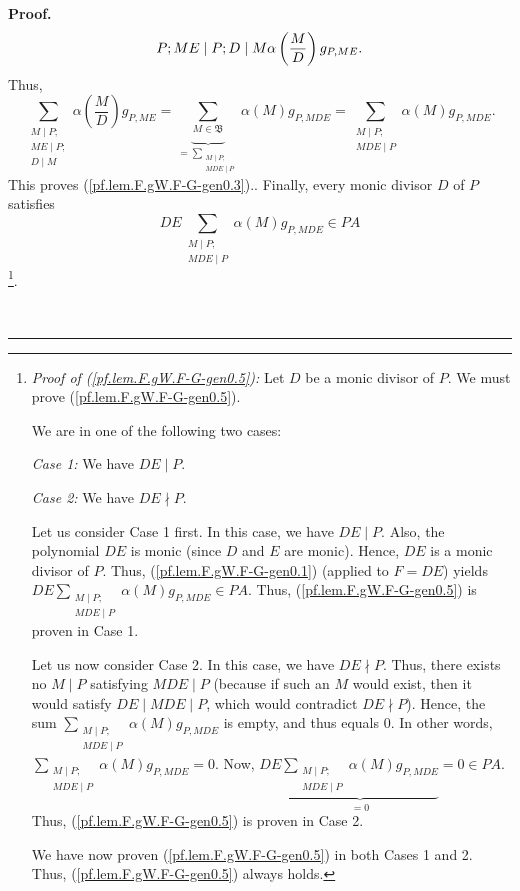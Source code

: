 \documentclass[numbers=enddot,12pt,final,onecolumn,notitlepage]{scrartcl}%
\theoremstyle{definition}
\newenvironment{proof}[1][Proof]{\noindent\textbf{#1.} }{\ \rule{0.5em}{0.5em}}
\let\sumnonlimits\sum
\renewcommand{\sum}{\sumnonlimits\limits}
\begin{document}
\begin{proof}
{\[{{P;\\ME\mid P;\\D\mid M}}\alpha\left(  \dfrac{M}{D}\right)  g_{P,ME}.
\]
Thus,%
\[
\sum_{\substack{M\mid P;\\ME\mid P;\\D\mid M}}\alpha\left(  \dfrac{M}%
{D}\right)  g_{P,ME}=\underbrace{\sum_{M\in\mathfrak{B}}}_{=\sum
_{\substack{M\mid P;\\MDE\mid P}}}\alpha\left(  M\right)  g_{P,MDE}%
=\sum_{\substack{M\mid P;\\MDE\mid P}}\alpha\left(  M\right)  g_{P,MDE}.
\]
This proves (\ref{pf.lem.F.gW.F-G-gen0.3}).}. Finally, every monic divisor $D$
of $P$ satisfies
\begin{equation}
DE\sum_{\substack{M\mid P;\\MDE\mid P}}\alpha\left(  M\right)  g_{P,MDE}\in PA
\label{pf.lem.F.gW.F-G-gen0.5}%
\end{equation}
\footnote{\textit{Proof of (\ref{pf.lem.F.gW.F-G-gen0.5}):} Let $D$ be a monic
divisor of $P$. We must prove (\ref{pf.lem.F.gW.F-G-gen0.5}).
\par
We are in one of the following two cases:
\par
\textit{Case 1:} We have $DE\mid P$.
\par
\textit{Case 2:} We have $DE\nmid P$.
\par
Let us consider Case 1 first. In this case, we have $DE\mid P$. Also, the
polynomial $DE$ is monic (since $D$ and $E$ are monic). Hence, $DE$ is a monic
divisor of $P$. Thus, (\ref{pf.lem.F.gW.F-G-gen0.1}) (applied to $F=DE$)
yields $DE\sum_{\substack{M\mid P;\\MDE\mid P}}\alpha\left(  M\right)
g_{P,MDE}\in PA$. Thus, (\ref{pf.lem.F.gW.F-G-gen0.5}) is proven in Case 1.
\par
Let us now consider Case 2. In this case, we have $DE\nmid P$. Thus, there
exists no $M\mid P$ satisfying $MDE\mid P$ (because if such an $M$ would
exist, then it would satisfy $DE\mid MDE\mid P$, which would contradict
$DE\nmid P$). Hence, the sum $\sum_{\substack{M\mid P;\\MDE\mid P}%
}\alpha\left(  M\right)  g_{P,MDE}$ is empty, and thus equals $0$. In other
words, $\sum_{\substack{M\mid P;\\MDE\mid P}}\alpha\left(  M\right)
g_{P,MDE}=0$. Now, $DE\underbrace{\sum_{\substack{M\mid P;\\MDE\mid P}%
}\alpha\left(  M\right)  g_{P,MDE}}_{=0}=0\in PA$. Thus,
(\ref{pf.lem.F.gW.F-G-gen0.5}) is proven in Case 2.
\par
We have now proven (\ref{pf.lem.F.gW.F-G-gen0.5}) in both Cases 1 and 2. Thus,
(\ref{pf.lem.F.gW.F-G-gen0.5}) always holds.}.


\end{proof}
\end{document}
